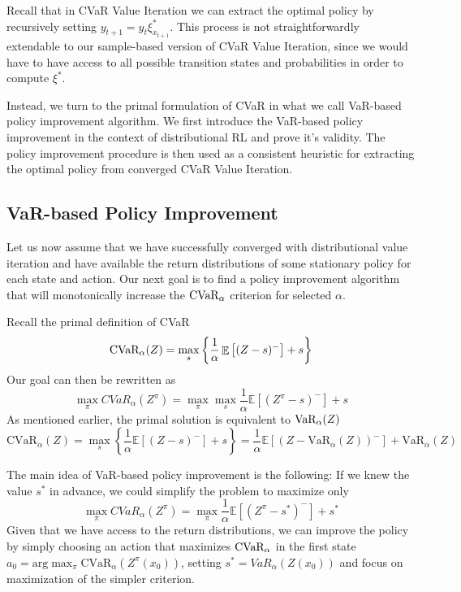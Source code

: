 Recall that in CVaR Value Iteration we can extract the optimal policy by recursively setting $y_{t+1}=y_t \xi^*_{x_{t+1}}$. This process is not straightforwardly extendable to our sample-based version of CVaR Value Iteration, since we would have to have access to all possible transition states and probabilities in order to compute $\xi^*$.

Instead, we turn to the primal formulation of CVaR in what we call VaR-based policy improvement algorithm. We first introduce the VaR-based policy improvement in the context of distributional RL and prove it's validity. The policy improvement procedure is then used as a consistent heuristic for extracting the optimal policy from converged CVaR Value Iteration.


\subsection{VaR-based Policy Improvement}

Let us now assume that we have successfully converged with distributional value iteration and have available the return distributions of some stationary policy for each state and action. Our next goal is to find a policy improvement algorithm that will monotonically increase the $\text{CVaR}_\alpha$ criterion for selected $\alpha$.

Recall the primal definition of CVaR 
\begin{equation*}
\text{CVaR}_\alpha(Z)=
\max_s\left\lbrace \dfrac{1}{\alpha}\mathop{\mathbb{E}}
\left[ (Z-s)^-\right] + s  \right\rbrace 
\end{equation*}
Our goal  can then be rewritten as
\begin{equation*}
\max_\pi CVaR_\alpha(Z^\pi) = \max_\pi \max_s \dfrac{1}{\alpha}\mathbb{E}
\left[ (Z^\pi-s)^-\right] + s
\end{equation*}
As mentioned earlier, the primal solution is equivalent to $\text{VaR}_\alpha(Z)$
\begin{equation*}
\text{CVaR}_\alpha(Z)=
\max_s\left\lbrace \dfrac{1}{\alpha}\mathbb{E}
\left[ (Z-s)^-\right] + s  \right\rbrace =\dfrac{1}{\alpha}\mathbb{E}
\left[ (Z - \text{VaR}_\alpha(Z))^-\right] + \text{VaR}_\alpha(Z) 
\end{equation*}

The main idea of VaR-based policy improvement is the following: If we knew the value $s^*$ in advance, we could simplify the problem to maximize only
\begin{equation}\label{eqn:varbasedgoal}
\max_\pi CVaR_\alpha(Z^\pi) = \max_\pi \dfrac{1}{\alpha}\mathbb{E}
\left[ (Z^\pi-s^*)^-\right] + s^*
\end{equation}
Given that we have access to the return distributions, we can improve the policy by simply choosing an action that maximizes $\text{CVaR}_\alpha$ in the first state $a_0 = \text{arg}\max_\pi\text{CVaR}_\alpha(Z^\pi(x_0))$, setting $s^* = VaR_\alpha(Z(x_0))$ and focus on maximization of the simpler criterion.

